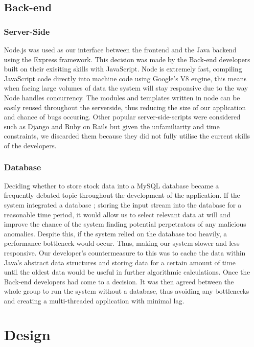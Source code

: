 \documentclass[12pt]{article}
\begin{document}
  \subsection{Back-end}
    \subsubsection{Server-Side}
    Node.js was used as our interface between the frontend and the Java backend using the Express framework.
    This decision was made by the Back-end developers built on their exisiting skills with JavaScript. Node is extremely fast,
    compiling JavaScript code directly into machine code using Google's V8 engine, this means when facing large volumes of data
    the system will stay responsive due to the way Node handles concurrency. The modules and templates written in node can be easily
    reused throughout the serverside, thus reducing the size of our application and chance of bugs occuring.
    \newline
    Other popular server-side-scripts were considered such as Django and Ruby on Rails but given the unfamiliarity and time
    constraints, we discarded them because they did not fully utilise the current skills of the developers.
    \subsubsection{Database}
    Deciding whether to store stock data into a MySQL database became a frequently debated topic throughout the development of the application.
    If the system integrated a database ; storing the input stream into the database for a reasonable time period, it would allow us to
    select relevant data at will and improve the chance of the system finding potential perpetrators of any malicious anomalies.
    \newline
    Despite this, if the system relied on the database too heavily, a performance bottleneck would occur. Thus, making our system slower and less responsive.
    Our developer's countermeasure to this was to cache the data within Java's abstract data structures and storing data for a certain amount
    of time until the oldest data would be useful in further algorithmic calculations.
    \newline
    Once the Back-end developers had come to a decision. It was then agreed between the whole group to run the system without a database, thus avoiding
    any bottlenecks and creating a multi-threaded application with minimal lag.
\section{Design}
\end{document}

